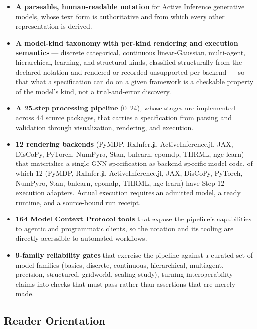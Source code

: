 \documentclass[
  english,
  9pt,
]{extarticle}
\providecommand{\tightlist}{%
  \setlength{\itemsep}{0pt}\setlength{\parskip}{0pt}}
\begin{document}
\begin{itemize}
\tightlist
\item
  \textbf{A parseable, human-readable notation} for Active Inference
  generative models, whose text form is authoritative and from which
  every other representation is derived.
\item
  \textbf{A model-kind taxonomy with per-kind rendering and execution
  semantics} --- discrete categorical, continuous linear-Gaussian,
  multi-agent, hierarchical, learning, and structural kinds, classified
  structurally from the declared notation and rendered or
  recorded-unsupported per backend --- so that what a specification can
  do on a given framework is a checkable property of the model's kind,
  not a trial-and-error discovery.
\item
  \textbf{A 25-step processing pipeline} (0--24), whose stages are
  implemented across 44 source packages, that carries a specification
  from parsing and validation through visualization, rendering, and
  execution.
\item
  \textbf{12 rendering backends} (PyMDP, RxInfer.jl, ActiveInference.jl,
  JAX, DisCoPy, PyTorch, NumPyro, Stan, bnlearn, cpomdp, THRML,
  ngc-learn) that materialize a single GNN specification as
  backend-specific model code, of which 12 (PyMDP, RxInfer.jl,
  ActiveInference.jl, JAX, DisCoPy, PyTorch, NumPyro, Stan, bnlearn,
  cpomdp, THRML, ngc-learn) have Step 12 execution adapters. Actual
  execution requires an admitted model, a ready runtime, and a
  source-bound run receipt.
\item
  \textbf{164 Model Context Protocol tools} that expose the pipeline's
  capabilities to agentic and programmatic clients, so the notation and
  its tooling are directly accessible to automated workflows.
\item
  \textbf{9-family reliability gates} that exercise the pipeline against
  a curated set of model families (basics, discrete, continuous,
  hierarchical, multiagent, precision, structured, gridworld,
  scaling-study), turning interoperability claims into checks that must
  pass rather than assertions that are merely made.
\end{itemize}

\subsection{Reader Orientation}\label{reader-orientation}
\end{document}
